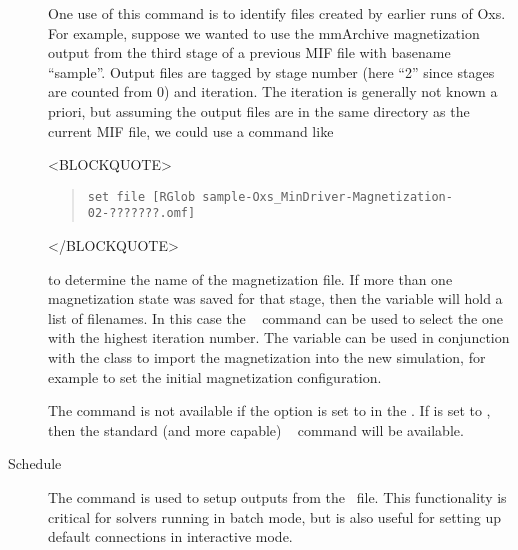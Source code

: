 \begin{description}
One use of this command is to identify files created by earlier runs of
Oxs.  For example, suppose we wanted to use the mmArchive magnetization
output from the third stage of a previous MIF file with basename ``sample''.
Output files are tagged by stage number (here ``2'' since stages are
counted from 0) and iteration.  The iteration is generally not known a
priori, but assuming the output files are in the same directory as the
current MIF file, we could use a command like
\begin{rawhtml}
<BLOCKQUOTE>
\end{rawhtml}
\begin{quote}
\begin{verbatim}
set file [RGlob sample-Oxs_MinDriver-Magnetization-02-???????.omf]
\end{verbatim}
\end{quote}
\begin{rawhtml}
</BLOCKQUOTE>
\end{rawhtml}
to determine the name of the magnetization file.  If more than one
magnetization state was saved for that stage, then the variable
 will hold a list of filenames.  In this case the \Tcl\ 
command can be used to select the one with the highest iteration number.
The  variable can be used in conjunction with the
class to import the magnetization into the new simulation, for example
to set the initial magnetization configuration.

The  command is not available if the 
option is set to  in the 
.  If  is set to
, then the standard (and more capable) \Tcl\
 command will be available.

\item[Schedule\label{html:scheduleCmd}]
The \cd{Schedule} command is used to setup outputs from the \MIF\ file.
This functionality is critical for solvers running in batch mode, but is
also useful for setting up default connections in interactive mode.


\end{description}
